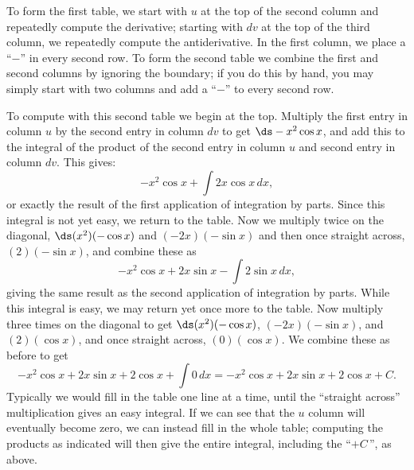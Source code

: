 To form the first table, we start with $u$ at the top of the second
column and repeatedly compute the derivative; starting with $dv$ at
the top of the third column, we repeatedly compute the
antiderivative. In the first column, we place a ``$-$'' in every
second row. To form the 
second table we combine the first and second columns by
ignoring the boundary; if you do this by hand, you may simply start
with two columns and add a ``$-$'' to every second row.

To compute with this second table we begin at the top. Multiply the
first entry in column $u$ by the second entry in column $dv$ to get
$\ds -x^2\cos x$, and add this to the integral of the product of the
second entry in column $u$ and second entry in column $dv$.  This
gives:
$$-x^2\cos x+\int 2x\cos x\,dx,$$
or exactly the result of the first application of integration by
parts.  Since this integral is not yet easy, we return to the table.
Now we multiply twice on the diagonal, $\ds (x^2)(-\cos x)$ and
$(-2x)(-\sin x)$ and then once straight across, $(2)(-\sin x)$, and
combine these as
$$-x^2\cos x+2x\sin x-\int 2\sin x\,dx,$$
giving the same result as the second application of integration by
parts. While this integral is easy, we may return yet once more to the
table. Now multiply three times on the diagonal to get $\ds
(x^2)(-\cos x)$, $(-2x)(-\sin x)$, and $(2)(\cos x)$, and once
straight across, $(0)(\cos x)$. We combine these as before to get
$$
  -x^2\cos x+2x\sin x +2\cos x+\int 0\,dx=
  -x^2\cos x+2x\sin x +2\cos x+C.
$$
Typically we would fill in the table one line at a time, until the
``straight across'' multiplication gives an easy integral. If we can
see that the $u$ column will eventually become zero, we can instead
fill in the whole table; computing the products as indicated will then
give the entire integral, including the ``$+C\,$'', as above.

